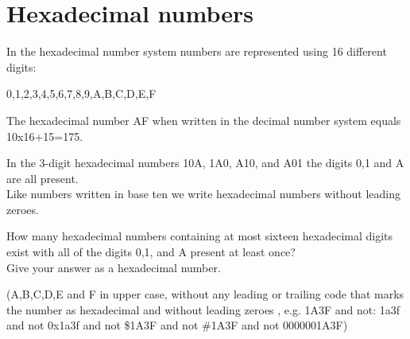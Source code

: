\section[Problem \#162: Hexadecimal numbers]{Hexadecimal numbers}
\label{sec:problem_162}

In the hexadecimal number system numbers are represented using 16
different digits:

\begin{center}0,1,2,3,4,5,6,7,8,9,A,B,C,D,E,F\end{center}

The hexadecimal number AF when written in the decimal number system
equals 10x16+15=175.

In the 3-digit hexadecimal numbers 10A, 1A0, A10, and A01 the digits 0,1
and A are all present.\\
Like numbers written in base ten we write hexadecimal numbers without
leading zeroes.

How many hexadecimal numbers containing at most sixteen hexadecimal
digits exist with all of the digits 0,1, and A present at least once?\\
Give your answer as a hexadecimal number.

(A,B,C,D,E and F in upper case, without any leading or trailing code
that marks the number as hexadecimal and without leading zeroes , e.g.
1A3F and not: 1a3f and not 0x1a3f and not \$1A3F and not \#1A3F and not
0000001A3F)